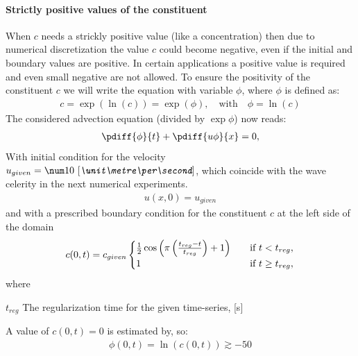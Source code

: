 \paragraph*{Strictly positive values of the constituent}
When $c$ needs a strickly positive value (like a concentration) then due to numerical discretization the value $c$ could become negative, even if the initial and boundary values are positive.
In certain applications a positive value is required and even small negative are not allowed.
To ensure the positivity of the constituent $c$ we will write the equation with variable $\phi$, where $\phi$ is defined as:
\begin{align}
    c = \exp(\ln(c)) =  \exp(\phi), \quad \text{with} \quad \phi = \ln(c)
\end{align}
The considered advection equation (divided by $\exp\phi$) now reads:
\begin{align}
    \pdiff{\phi}{t} + \pdiff{u\phi}{x} = 0,\label{eq:1d_advec_phi}
\end{align}
With initial condition for the velocity $u_{given} = \bqty{10}{\metre\per\second}$, which coincide with the wave celerity in the next numerical experiments.
\begin{align}
    u(x,0) = u_{given}
\end{align}
and with a prescribed boundary condition for the constituent $c$ at the left side of the domain
\begin{align}
    c(0,t) = c_{given}
    \begin{cases}
        \frac{1}{2} \cos\left(\pi \left(\frac{t_{reg} - t}{t_{reg}}\right)+ 1\right) &\quad \text{if } t < t_{reg},
        \\
        1 &\quad \text{if } t \geq t_{reg},
    \end{cases}
\end{align}
where
\begin{symbollist}
    \item[$t_{reg}$] The regularization time for the given time-series, [\si{\second}]
\end{symbollist}
A value of $c(0,t)=0$ is estimated by, so:
\begin{align}
    \phi(0,t) = \ln(c(0,t)) \gtrsim -50
\end{align}
